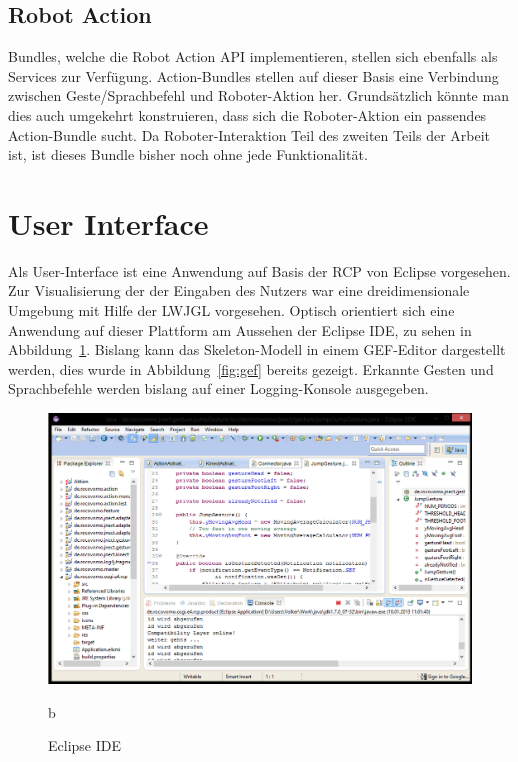 \subsection{Robot Action}
\label{subsec:Roboterschnittstelle}

Bundles, welche die Robot Action \acrshort{API} implementieren, stellen sich ebenfalls als Services zur Verf\"ugung. Action-Bundles stellen auf dieser 
Basis eine Verbindung zwischen Geste/Sprachbefehl und Roboter-Aktion her. Grunds\"atzlich k\"onnte man dies auch umgekehrt konstruieren, dass
sich die Roboter-Aktion ein passendes Action-Bundle sucht. Da Roboter-Interaktion Teil des zweiten Teils der Arbeit ist, ist dieses Bundle 
bisher noch ohne jede Funktionalit\"at.

\section{User Interface}

Als User-Interface ist eine Anwendung auf Basis der \gls{RCP} von Eclipse vorgesehen. Zur Visualisierung der 
der Eingaben des Nutzers war eine dreidimensionale Umgebung mit Hilfe der \gls{LWJGL} vorgesehen. 
Optisch orientiert sich eine Anwendung auf dieser Plattform am Aussehen der Eclipse IDE, zu sehen in Abbildung~\ref{fig:eclipse}. 
Bislang kann das Skeleton-Modell in einem GEF-Editor dargestellt werden, dies wurde in Abbildung~\ref{fig:gef} bereits gezeigt. Erkannte Gesten und Sprachbefehle werden bislang auf einer Logging-Konsole
ausgegeben.

\begin{figure}[htb]
\centering
\includegraphics[width=1\textwidth]{img/09kapitel/rcp.png}
\caption[Eclipse IDE]{Eclipse IDE}
\label{fig:eclipse}b
\end{figure}

